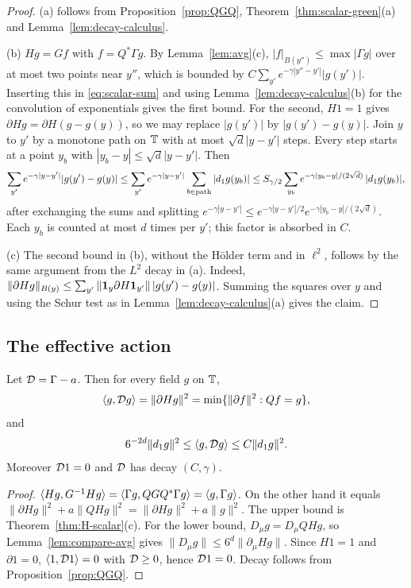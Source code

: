 \begin{proof}
(a) follows from Proposition~\ref{prop:QGQ}, Theorem~\ref{thm:scalar-green}(a) and Lemma~\ref{lem:decay-calculus}.

(b) $Hg=Gf$ with $f=Q^*\Gamma g$. By Lemma~\ref{lem:avg}(c), $|f|_{B(y'')}\le\max|\Gamma g|$ over at most two points near $y''$, which is bounded by $C\sum_{y'}e^{-\gamma|y''-y'|}|g(y')|$. Inserting this in \eqref{eq:scalar-sum} and using Lemma~\ref{lem:decay-calculus}(b) for the convolution of exponentials gives the first bound. For the second, $H1=1$ gives $\partial Hg=\partial H(g-g(y))$, so we may replace $|g(y')|$ by $|g(y')-g(y)|$. Join $y$ to $y'$ by a monotone path on $\mathbb T$ with at most $\sqrt d|y-y'|$ steps. Every step starts at a point $y_b$ with $|y_b-y|\le\sqrt d|y-y'|$. Then
\[
\sum_{y'}e^{-\gamma|y-y'|}|g(y')-g(y)|\le\sum_{y'}e^{-\gamma|y-y'|}\sum_{b\in\text{path}}|d_1 g(y_b)|\le S_{\gamma/2}\sum_{y_b}e^{-\gamma|y_b-y|/(2\sqrt d)}\,|d_1 g(y_b)|,
\]
after exchanging the sums and splitting $e^{-\gamma|y-y'|}\le e^{-\gamma|y-y'|/2}e^{-\gamma|y_b-y|/(2\sqrt d)}$. Each $y_b$ is counted at most $d$ times per $y'$; this factor is absorbed in $C$.

(c) The second bound in (b), without the H\"older term and in $\ell^2$, follows by the same argument from the $L^2$ decay in (a). Indeed, $\|\partial Hg\|_{B(y)}\le\sum_{y'}\|\mathbf 1_y\partial H\mathbf 1_{y'}\|\,|g(y')-g(y)|$. Summing the squares over $y$ and using the Schur test as in Lemma~\ref{lem:decay-calculus}(a) gives the claim.
\end{proof}

\subsection{The effective action}

\begin{proposition}\label{prop:eff-action-scalar}
Let $\mathcal D=\Gamma-a$. Then for every field $g$ on $\mathbb T$,
\[
\langle g,\mathcal D g\rangle=\|\partial Hg\|^2=\min\{\|\partial f\|^2:Qf=g\},
\]
and
\[
6^{-2d}\|d_1 g\|^2\le\langle g,\mathcal D g\rangle\le C\|d_1 g\|^2 .
\]
Moreover $\mathcal D1=0$ and $\mathcal D$ has decay $(C,\gamma)$.
\end{proposition}

\begin{proof}
$\langle Hg,G^{-1}Hg\rangle=\langle \Gamma g,QGQ^*\Gamma g\rangle=\langle g,\Gamma g\rangle$. On the other hand it equals $\|\partial Hg\|^2+a\|QHg\|^2=\|\partial Hg\|^2+a\|g\|^2$. The upper bound is Theorem~\ref{thm:H-scalar}(c). For the lower bound, $D_\mu g=D_\mu QHg$, so Lemma~\ref{lem:compare-avg} gives $\|D_\mu g\|\le6^d\|\partial_\mu Hg\|$. Since $H1=1$ and $\partial1=0$, $\langle 1,\mathcal D1\rangle=0$ with $\mathcal D\ge0$, hence $\mathcal D1=0$. Decay follows from Proposition~\ref{prop:QGQ}.
\end{proof}

